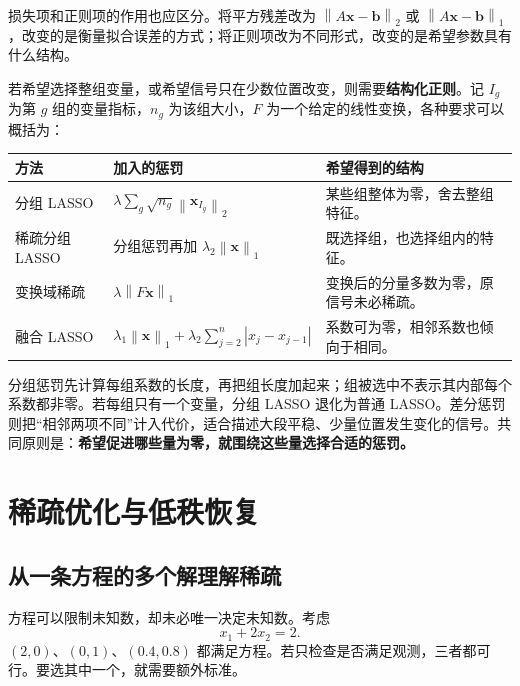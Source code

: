 \documentclass[UTF8,fontset=fandol,a4paper,12pt]{ctexart}
\newcommand{\vx}{\boldsymbol x}
\newcommand{\vb}{\boldsymbol b}
\newcommand{\norm}[1]{\left\lVert#1\right\rVert}
\theoremstyle{definition}
\begin{document}
损失项和正则项的作用也应区分。将平方残差改为 $\norm{A\vx-\vb}_2$ 或 $\norm{A\vx-\vb}_1$，改变的是衡量拟合误差的方式；将正则项改为不同形式，改变的是希望参数具有什么结构。

若希望选择整组变量，或希望信号只在少数位置改变，则需要\textbf{结构化正则}。记 $I_g$ 为第 $g$ 组的变量指标，$n_g$ 为该组大小，$F$ 为一个给定的线性变换，各种要求可以概括为：
\begin{center}
\begin{tabular}{p{}p{}p{}}
\toprule
方法 & 加入的惩罚 & 希望得到的结构\\
\midrule
分组 LASSO & $\lambda\sum_g\sqrt{n_g}\norm{\vx_{I_g}}_2$ & 某些组整体为零，舍去整组特征。\\
稀疏分组 LASSO & 分组惩罚再加 $\lambda_2\norm{\vx}_1$ & 既选择组，也选择组内的特征。\\
变换域稀疏 & $\lambda\norm{F\vx}_1$ & 变换后的分量多数为零，原信号未必稀疏。\\
融合 LASSO & $\lambda_1\norm{\vx}_1+\lambda_2\sum_{j=2}^n|x_j-x_{j-1}|$ & 系数可为零，相邻系数也倾向于相同。\\
\bottomrule
\end{tabular}
\end{center}
分组惩罚先计算每组系数的长度，再把组长度加起来；组被选中不表示其内部每个系数都非零。若每组只有一个变量，分组 LASSO 退化为普通 LASSO。差分惩罚则把“相邻两项不同”计入代价，适合描述大段平稳、少量位置发生变化的信号。共同原则是：\textbf{希望促进哪些量为零，就围绕这些量选择合适的惩罚。}

\section{稀疏优化与低秩恢复}\label{sec:sparse}
\subsection{从一条方程的多个解理解稀疏}
方程可以限制未知数，却未必唯一决定未知数。考虑
\[
 x_1+2x_2=2.
\]
$(2,0)$、$(0,1)$、$(0.4,0.8)$ 都满足方程。若只检查是否满足观测，三者都可行。要选其中一个，就需要额外标准。
\end{document}

